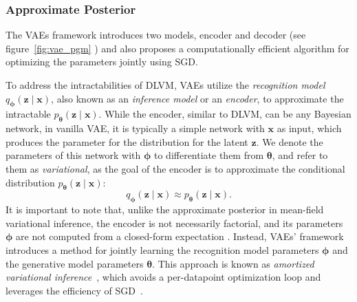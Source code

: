 \subsubsection{Approximate Posterior}
\label{subsubsec:vae_encoder}
The VAEs framework introduces two models, encoder and decoder (see figure~\ref{fig:vae_pgm} ) and also proposes a computationally efficient algorithm for optimizing the parameters jointly
using SGD.

To address the intractabilities of DLVM, VAEs utilize the \textit{recognition model} $q_{\boldsymbol{\phi}}(\mathbf{z}\mid \mathbf{x})$, also known as an 
\textit{inference model} or an \textit{encoder}, to approximate the intractable $p_{\boldsymbol{\theta}}(\mathbf{z}\mid \mathbf{x})$. 
While the encoder, similar 
to DLVM, can be any Bayesian network, in vanilla VAE, it is typically a simple network with $\mathbf{x}$ as input, which produces the parameter for
the distribution for the latent $\mathbf{z}$. We denote the parameters of this network with ${\boldsymbol{\phi}}$ to differentiate them from ${\boldsymbol{\theta}}$, and refer
to them as \textit{variational}, as the goal of the encoder is to approximate the conditional distribution $p_{\boldsymbol{\theta}}(\mathbf{z}\mid \mathbf{x})$:
$$
q_{\boldsymbol{\phi}}(\mathbf{z}\mid \mathbf{x}) \approx p_{\boldsymbol{\theta}}(\mathbf{z}\mid \mathbf{x}).
$$
It is important to note that, unlike the approximate posterior in mean-field variational inference, the encoder is not necessarily factorial, and
its parameters ${\boldsymbol{\phi}}$ are not computed from a closed-form expectation \cite{vae-original-2013}. Instead, VAEs' framework introduces a method for 
jointly learning the recognition model parameters ${\boldsymbol{\phi}}$ and the generative model parameters ${\boldsymbol{\theta}}$.  This approach is known as \textit{amortized 
variational inference}~\cite{amortized-inference-2014}, which avoids a per-datapoint optimization loop and leverages the efficiency of SGD~\cite{intro-vae-2019}.

